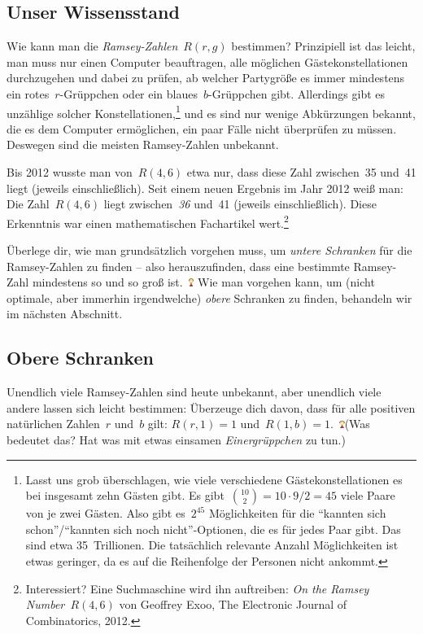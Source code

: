 \documentclass{../../zirkelblatt1718}
\theoremstyle{definition}
\theoremstyle{plain}
\theoremstyle{remark}
\newcommand{\happy}{\includegraphics[height=0.7em]{happy}\xspace}
\begin{document}
\subsection{Unser Wissensstand}

Wie kann man die \emph{Ramsey-Zahlen}~$R(r,g)$ bestimmen? Prinzipiell ist das
leicht, man muss nur einen Computer beauftragen, alle möglichen
Gästekonstellationen durchzugehen und dabei zu prüfen, ab welcher Partygröße es
immer mindestens ein rotes~$r$-Grüppchen oder ein blaues~$b$-Grüppchen gibt.
Allerdings gibt es unzählige solcher Konstellationen,\footnote{Lasst uns grob
überschlagen, wie viele verschiedene Gästekonstellationen es bei insgesamt zehn
Gästen gibt. Es gibt~$\binom{10}{2} = 10 \cdot 9 / 2 = 45$ viele Paare von je zwei
Gästen. Also gibt es~$2^{45}$ Möglichkeiten für die "`kannten sich
schon"'/"`kannten sich noch nicht"'-Optionen, die es für jedes Paar gibt. Das
sind etwa 35~Trillionen. Die tatsächlich relevante Anzahl Möglichkeiten ist
etwas geringer, da es auf die Reihenfolge der Personen nicht ankommt.}
und es sind nur wenige Abkürzungen bekannt, die es dem Computer ermöglichen,
ein paar Fälle nicht überprüfen zu müssen. Deswegen sind die meisten
Ramsey-Zahlen unbekannt.

Bis 2012 wusste man von~$R(4,6)$ etwa nur, dass diese Zahl zwischen~35 und~41
liegt (jeweils einschließlich). Seit einem neuen Ergebnis im Jahr 2012 weiß
man: Die Zahl~$R(4,6)$ liegt zwischen~\emph{36} und~41 (jeweils
einschließlich). Diese Erkenntnis war einen mathematischen Fachartikel
wert.\footnote{Interessiert? Eine Suchmaschine wird ihn auftreiben: \emph{On
the Ramsey Number~$R(4,6)$} von Geoffrey Exoo, The Electronic Journal of
Combinatorics, 2012.}

Überlege dir, wie man grundsätzlich vorgehen muss, um \emph{untere Schranken}
für die Ramsey-Zahlen zu finden -- also herauszufinden, dass eine bestimmte
Ramsey-Zahl mindestens so und so groß ist.~\happy Wie man vorgehen kann, um
(nicht optimale, aber immerhin irgendwelche) \emph{obere} Schranken zu finden,
behandeln wir im nächsten Abschnitt.


\subsection{Obere Schranken}

Unendlich viele Ramsey-Zahlen sind heute unbekannt, aber unendlich viele andere
lassen sich leicht bestimmen: Überzeuge dich davon, dass für alle positiven
natürlichen Zahlen~$r$ und~$b$ gilt: $R(r,1) = 1$ und~$R(1,b) = 1$.~\happy (Was
bedeutet das? Hat was mit etwas einsamen \emph{Einergrüppchen} zu tun.)
\end{document}

